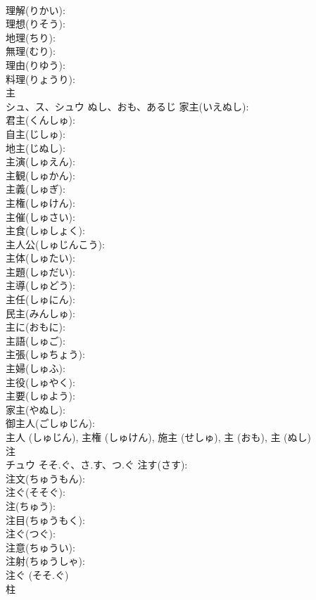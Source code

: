 \documentclass[8pt]{extreport}
\begin{document}
\begin{CJK}{UTF8}{min}
\\	理解(りかい): 
\\	理想(りそう): 
\\	地理(ちり): 
\\	無理(むり): 
\\	理由(りゆう): 
\\	料理(りょうり): 
\\	主			
\\	シュ、ス、シュウ	ぬし、おも、あるじ	家主(いえぬし): 
\\	君主(くんしゅ): 
\\	自主(じしゅ): 
\\	地主(じぬし): 
\\	主演(しゅえん): 
\\	主観(しゅかん): 
\\	主義(しゅぎ): 
\\	主権(しゅけん): 
\\	主催(しゅさい): 
\\	主食(しゅしょく): 
\\	主人公(しゅじんこう): 
\\	主体(しゅたい): 
\\	主題(しゅだい): 
\\	主導(しゅどう): 
\\	主任(しゅにん): 
\\	民主(みんしゅ): 
\\	主に(おもに): 
\\	主語(しゅご): 
\\	主張(しゅちょう): 
\\	主婦(しゅふ): 
\\	主役(しゅやく): 
\\	主要(しゅよう): 
\\	家主(やぬし): 
\\	御主人(ごしゅじん): 
\\	主人 (しゅじん), 主権 (しゅけん), 施主 (せしゅ), 主 (おも), 主 (ぬし)
\\	注			
\\	チュウ	そそ.ぐ、さ.す、つ.ぐ	注す(さす): 
\\	注文(ちゅうもん): 
\\	注ぐ(そそぐ): 
\\	注(ちゅう): 
\\	注目(ちゅうもく): 
\\	注ぐ(つぐ): 
\\	注意(ちゅうい): 
\\	注射(ちゅうしゃ): 
\\	注ぐ (そそ.ぐ)
\\	柱			

\end{CJK}
\end{document}
